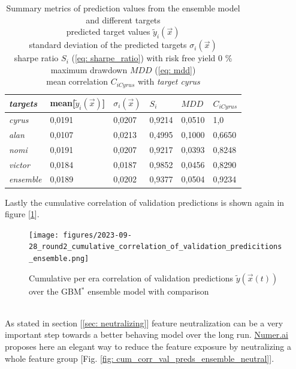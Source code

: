 \documentclass[12pt, a4paper]{article}
\begin{document}
\begin{table}[!htbp]
\centering
\caption{Summary metrics of prediction values from the ensemble model and different targets \\
predicted target values $\tilde{y}_i(\vec{x})$ \\
standard deviation of the predicted targets $\sigma_i(\vec{x})$ \\
sharpe ratio $S_i$ (\ref{eq: sharpe_ratio}) with risk free yield 0 \% \\
maximum drawdown $MDD$ (\ref{eq: mdd}) \\
mean correlation $C_{iCyrus}$ with \textit{target cyrus} \\}
\label{table: summary_metric_predictions_ensemble}
\begin{tabular}{|l|l|l|l|l|l|}
\hline
\textit{targets} & mean[$\tilde{y}_i(\vec{x})$] & $\sigma_i(\vec{x})$ & $S_i$ & $MDD$ & $C_{iCyrus}$ \\ \hline
\hline
\hline
\textit{cyrus} & 0,0191 & 0,0207 & 0,9214 & 0,0510 & 1,0  \\ \hline
\textit{alan} & 0,0107 & 0,0213 & 0,4995 & 0,1000 & 0,6650 \\ \hline
\textit{nomi} & 0,0191 & 0,0207 & 0,9217 & 0,0393 & 0,8248 \\ \hline
\textit{victor} & 0,0184 & 0,0187 & 0,9852 & 0,0456 &  0,8290 \\ \hline
\hline
\textit{ensemble} & 0,0189 & 0,0202 & 0,9377 & 0,0504 & 0,9234 \\ \hline
\end{tabular}
\end{table}
Lastly the cumulative correlation of validation predictions is shown again in figure [\ref{fig: cum_corr_val_preds_ensemble}].
\begin{figure}[!htpb]
    \centering
    \texttt{[image: figures/2023-09-28\_round2\_cumulative\_correlation\_of\_validation\_predicitions\_ensemble.png]}
    \caption[Cumulative per era correlation of validation predictions over the GBM$^{\ast}$ ensemble model with comparison]{Cumulative per era correlation of validation predictions $\tilde{y}(\vec{x}(t))$ over the GBM$^{\ast}$ ensemble model with comparison}
    \label{fig: cum_corr_val_preds_ensemble}    
\end{figure}
\\
As stated in section [\ref{sec: neutralizing}] feature neutralization can be a very important step towards a better behaving model over the long run. \href{https://numer.ai}{Numer.ai} proposes here an elegant way to reduce the feature exposure by neutralizing a whole feature group [Fig. \ref{fig: cum_corr_val_preds_ensemble_neutral}]. 
\end{document}
